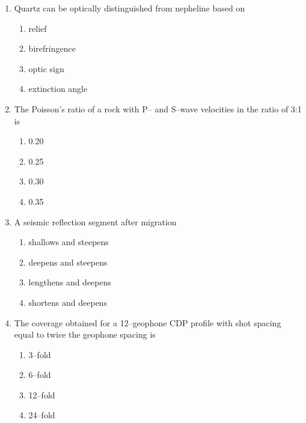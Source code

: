 \documentclass[journal,12pt,onecolumn]{IEEEtran}
\theoremstyle{remark}
\begin{document}
\begin{enumerate}[resume]
\item Quartz can be optically distinguished from nepheline based on

\begin{multicols}{2}
\begin{enumerate}
\item relief  
\item birefringence  
\item optic sign  
\item extinction angle  
\end{enumerate}
\end{multicols}
\vspace{0.5cm}

\item The Poisson's ratio of a rock with P-- and S--wave velocities in the ratio of 3:1 is

\begin{multicols}{4}
\begin{enumerate}
\item 0.20  
\item 0.25  
\item 0.30  
\item 0.35  
\end{enumerate}
\end{multicols}
\vspace{0.5cm}

\item A seismic reflection segment after migration
\begin{enumerate}

\item shallows and steepens  
\item deepens and steepens  
\item lengthens and deepens  
\item shortens and deepens  
\vspace{0.5cm}
\end{enumerate}

\item The coverage obtained for a 12--geophone CDP profile with shot spacing equal to twice the geophone spacing is

\begin{multicols}{4}
\begin{enumerate}
\item 3--fold  
\item 6--fold  
\item 12--fold  
\item 24--fold  
\end{enumerate}
\end{multicols}
\vspace{0.5cm}


\end{enumerate}
\end{document}
